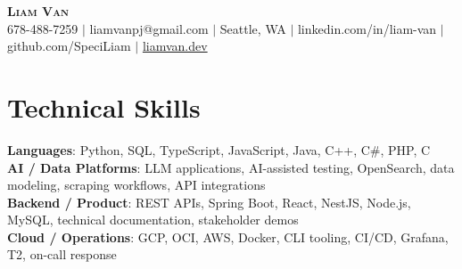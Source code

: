 \documentclass[letterpaper,11pt]{article}
\begin{document}

%
\begin{center}
    \textbf{\Huge \scshape Liam Van} \\ \vspace{1pt}
    \small 678-488-7259 $|$ \small {liamvanpj@gmail.com} $|$ Seattle, WA
 {{$|$ linkedin.com/in/liam-van} {$|$ github.com/SpeciLiam} {$|$ \href{https://liamvan.dev}{liamvan.dev}}}

\end{center}

\section{Technical Skills}
 \begin{itemize}[leftmargin=0.15in, label={}]
    \small{\item{
     \textbf{Languages}{: Python, SQL, TypeScript, JavaScript, Java, C++, C\#, PHP, C} \\
     \textbf{AI / Data Platforms}{: LLM applications, AI-assisted testing, OpenSearch, data modeling, scraping workflows, API integrations} \\
     \textbf{Backend / Product}{: REST APIs, Spring Boot, React, NestJS, Node.js, MySQL, technical documentation, stakeholder demos} \\
     \textbf{Cloud / Operations}{: GCP, OCI, AWS, Docker, CLI tooling, CI/CD, Grafana, T2, on-call response} \\
    }}
 \end{itemize}
%

\end{document}
